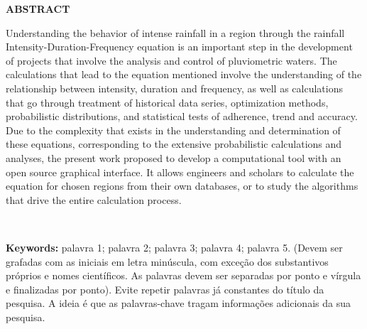 \thispagestyle{empty}

\singlespacing
\begin{center}
	\textbf{ABSTRACT}
\end{center}

\noindent Understanding the behavior of intense rainfall in a region through the rainfall Intensity-Duration-Frequency equation is an important step in the development of projects that involve the analysis and control of pluviometric waters. The calculations that lead to the equation mentioned involve the understanding of the relationship between intensity, duration and frequency, as well as calculations that go through treatment of historical data series, optimization methods, probabilistic distributions, and statistical tests of adherence, trend and accuracy. Due to the complexity that exists in the understanding and determination of these equations, corresponding to the extensive probabilistic calculations and analyses, the present work proposed to develop a computational tool with an open source graphical interface. It allows engineers and scholars to calculate the equation for chosen regions from their own databases, or to study the algorithms that drive the entire calculation process.

\ \

\noindent \textbf{Keywords:} palavra 1; palavra 2; palavra 3; palavra 4; palavra 5. (Devem ser grafadas com as iniciais em letra minúscula, com exceção dos substantivos próprios e nomes científicos. As palavras devem ser separadas por ponto e vírgula e finalizadas por ponto). Evite repetir palavras já constantes do título da pesquisa. A ideia é que as palavras-chave tragam informações adicionais da sua pesquisa.
\newpage
